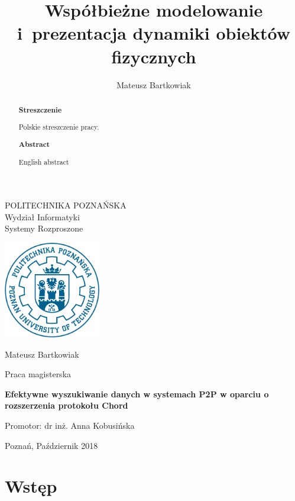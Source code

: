 \documentclass[12pt, twoside, openany]{report}
\author{Mateusz Bartkowiak}
\title{Współbieżne modelowanie i~prezentacja dynamiki obiektów fizycznych}
\begin{document}
\begin{titlepage}

\noindent


\centering
\Large POLITECHNIKA POZNAŃSKA\\
\Large Wydział Informatyki\\
\large Systemy Rozproszone

\vfill
\includegraphics[width=120pt,height=120pt]{PP}

\vfill
\center
\LARGE
Mateusz Bartkowiak

\center
\Large
Praca magisterska

\vfill
\center
\Huge
\textbf{Efektywne wyszukiwanie danych w systemach P2P w oparciu o rozszerzenia protokołu Chord}


\vfill
\center
\Large
Promotor: dr inż. Anna Kobusińska

\vfill
\center
\large
Poznań, Październik 2018

\end{titlepage}

\renewcommand{\abstractname}{}
\begin{abstract}
\thispagestyle{plain} %
\begin{center}
\textbf{Streszczenie}
\end{center}

\indent
Polskie streszczenie pracy.

\vspace{50px}
\begin{center}
\textbf{Abstract}
\end{center}

\indent
English abstract

\end{abstract}


\tableofcontents



\chapter{Wstęp}
\end{document}
